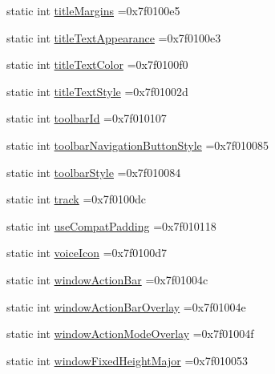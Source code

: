 \begin{DoxyCompactItemize}
\item 
static int \hyperlink{classandroid_1_1support_1_1v7_1_1cardview_1_1R_1_1attr_a56eb14b3fe1237fddcc2b1837677a229}{title\+Margins} =0x7f0100e5
\item 
static int \hyperlink{classandroid_1_1support_1_1v7_1_1cardview_1_1R_1_1attr_af05d7a19e10d8dc2559fa9ea74564708}{title\+Text\+Appearance} =0x7f0100e3
\item 
static int \hyperlink{classandroid_1_1support_1_1v7_1_1cardview_1_1R_1_1attr_aeb03451b46c4b9a227b1dc0d451dfd00}{title\+Text\+Color} =0x7f0100f0
\item 
static int \hyperlink{classandroid_1_1support_1_1v7_1_1cardview_1_1R_1_1attr_a51262633643c8f1e23f18798bc06f662}{title\+Text\+Style} =0x7f01002d
\item 
static int \hyperlink{classandroid_1_1support_1_1v7_1_1cardview_1_1R_1_1attr_a602ae2bf742a9f0969aa808023ae9582}{toolbar\+Id} =0x7f010107
\item 
static int \hyperlink{classandroid_1_1support_1_1v7_1_1cardview_1_1R_1_1attr_ae9cf75ca8aefa0117e4e6fddd9c56df2}{toolbar\+Navigation\+Button\+Style} =0x7f010085
\item 
static int \hyperlink{classandroid_1_1support_1_1v7_1_1cardview_1_1R_1_1attr_a15aeffa2084d228a200644658187a6cf}{toolbar\+Style} =0x7f010084
\item 
static int \hyperlink{classandroid_1_1support_1_1v7_1_1cardview_1_1R_1_1attr_a4646bbcc651a7caae0d2a11b80495257}{track} =0x7f0100dc
\item 
static int \hyperlink{classandroid_1_1support_1_1v7_1_1cardview_1_1R_1_1attr_a6af56f642b192d4d5ea22a6b22350cd3}{use\+Compat\+Padding} =0x7f010118
\item 
static int \hyperlink{classandroid_1_1support_1_1v7_1_1cardview_1_1R_1_1attr_a41d30edeb1f59d1e42791fa7ce86ce17}{voice\+Icon} =0x7f0100d7
\item 
static int \hyperlink{classandroid_1_1support_1_1v7_1_1cardview_1_1R_1_1attr_a0bad591cfb7bcb7ff02f183bac2401fd}{window\+Action\+Bar} =0x7f01004c
\item 
static int \hyperlink{classandroid_1_1support_1_1v7_1_1cardview_1_1R_1_1attr_ac53d0d65ea305899e1b811ba1d3151c9}{window\+Action\+Bar\+Overlay} =0x7f01004e
\item 
static int \hyperlink{classandroid_1_1support_1_1v7_1_1cardview_1_1R_1_1attr_a9c6ffb9526f039bcd2fa1ce1756eb371}{window\+Action\+Mode\+Overlay} =0x7f01004f
\item 
static int \hyperlink{classandroid_1_1support_1_1v7_1_1cardview_1_1R_1_1attr_a60358e25c5caa9936e1ff906a18e2212}{window\+Fixed\+Height\+Major} =0x7f010053

\end{DoxyCompactItemize}
